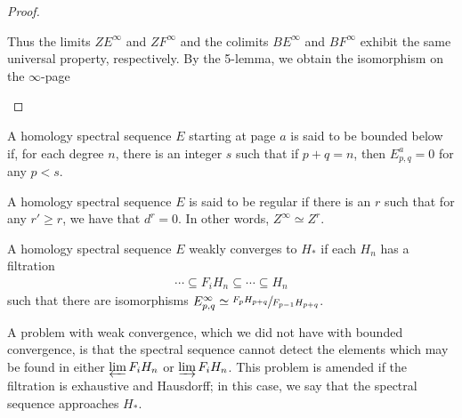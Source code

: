 \documentclass[../thesis.tex]{subfiles}
\begin{document}
\begin{proof}
\begin{center}
            \end{center}
            Thus the limits $ZE^\infty$ and $ZF^\infty$ and the colimits $BE^\infty$ and $BF^\infty$ exhibit the same universal property, respectively. By the 5-lemma, we obtain the isomorphism on the $\infty$-page
            \begin{center}
            \end{center}
        \end{proof}

        \begin{definition}
            A homology spectral sequence $E$ starting at page $a$ is said to be bounded below if, for each degree $n$, there is an integer $s$ such that if $p+q = n$, then $E^a_{p,q} = 0$ for any $p < s$. 
        \end{definition}

        \begin{definition}
            A homology spectral sequence $E$ is said to be regular if there is an $r$ such that for any $r' \geq r$, we have that $d^r = 0$. In other words, $Z^\infty \simeq Z^r$.
        \end{definition}

        \begin{definition}
            A homology spectral sequence $E$ weakly converges to $H_*$ if each $H_n$ has a filtration
            \begin{align*}
                \cdots \subseteq F_iH_n \subseteq \cdots \subseteq H_n
            \end{align*}
            such that there are isomorphisms $E^\infty_{p,q} \simeq \sfrac{F_pH_{p+q}}{F_{p-1}H_{p+q}}$.
        \end{definition}

        A problem with weak convergence, which we did not have with bounded convergence, is that the spectral sequence cannot detect the elements which may be found in either $\varprojlim F_iH_n$ or $\varinjlim F_iH_n$. This problem is amended if the filtration is exhaustive and Hausdorff; in this case, we say that the spectral sequence approaches $H_*$.
\end{document}
